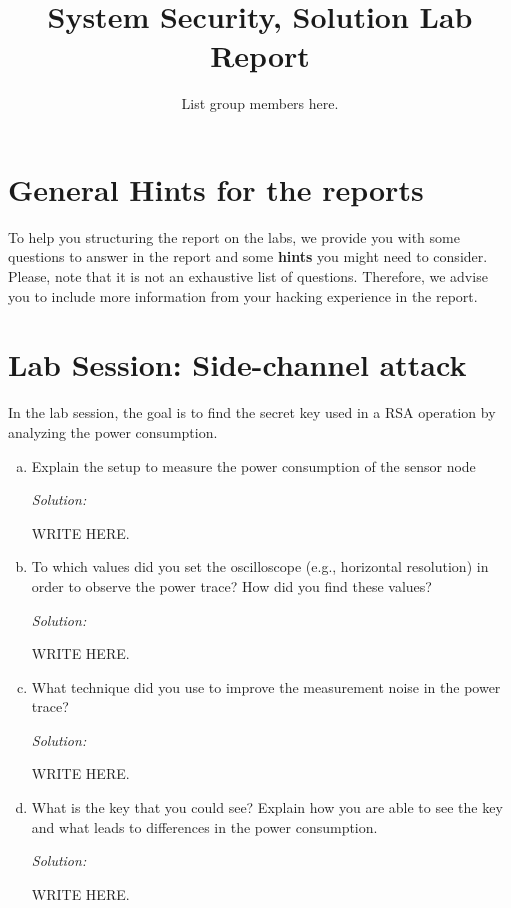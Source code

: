 \documentclass[a4paper,11pt]{article}
\title{System Security,
\ifsolution Solution \else \fi
Lab Report}
\author{List group members here.}
\newenvironment{solution}%
{\par{\noindent\small\textit{Solution:}}\vspace{-12pt}\begin{framed}}%
{\end{framed}\par}
\begin{document}
\maketitle

\section{General Hints for the reports}

To help you structuring the report on the labs, we provide you with some
questions to answer in the report and some \textbf{hints} you might need to
consider. Please, note that it is not an exhaustive list of questions.
Therefore, we advise you to include more information from your hacking
experience in the report.

\section{Lab Session: Side-channel attack}
In the lab session, the goal is to find the secret key used in a RSA
operation by analyzing the power consumption.
\begin{enumerate}[(a)]
\item Explain the setup to measure the power consumption of the sensor node
\ifsolution\begin{solution}
WRITE HERE.
\end{solution}\fi

\item To which values did you set the oscilloscope (e.g., horizontal
resolution) in order to observe the power trace? How did you find
these values?
\ifsolution\begin{solution}
WRITE HERE.
\end{solution}\fi

\item What technique did you use to improve the measurement noise in
the power trace?
\ifsolution\begin{solution}
WRITE HERE.
\end{solution}\fi

\item What is the key that you could see? Explain how you are able to
see the key and what leads to differences in the power consumption.
\ifsolution\begin{solution}
WRITE HERE.
\end{solution}\fi

\end{enumerate}
\end{document}
